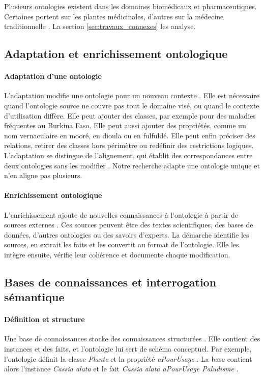 Plusieurs ontologies existent dans les domaines biomédicaux et pharmaceutiques. Certaines portent sur les plantes médicinales, d'autres sur la médecine traditionnelle \cite{shojaee-mend_development_2019}. La section \ref{sec:travaux_connexes} les analyse.

\subsection{Adaptation et enrichissement ontologique}
\label{subsec:adaptation_enrichissement}

\paragraph{Adaptation d'une ontologie}
L'adaptation modifie une ontologie pour un nouveau contexte \cite{klein2001ontologyversioning}. Elle est nécessaire quand l'ontologie source ne couvre pas tout le domaine visé, ou quand le contexte d'utilisation diffère. Elle peut ajouter des classes, par exemple pour des maladies fréquentes au Burkina Faso. Elle peut aussi ajouter des propriétés, comme un nom vernaculaire en mooré, en dioula ou en fulfuldé. Elle peut enfin préciser des relations, retirer des classes hors périmètre ou redéfinir des restrictions logiques. L'adaptation se distingue de l'alignement, qui établit des correspondances entre deux ontologies sans les modifier \cite{euzenat2013ontology}. Notre recherche adapte une ontologie unique et n'en aligne pas plusieurs.

\paragraph{Enrichissement ontologique}
L'enrichissement ajoute de nouvelles connaissances à l'ontologie à partir de sources externes \cite{navigli2003ontologylearning}. Ces sources peuvent être des textes scientifiques, des bases de données, d'autres ontologies ou des savoirs d'experts. La démarche identifie les sources, en extrait les faits et les convertit au format de l'ontologie. Elle les intègre ensuite, vérifie leur cohérence et documente chaque modification.

\subsection{Bases de connaissances et interrogation sémantique}
\label{subsec:bases_connaissances}

\paragraph{Définition et structure}
Une base de connaissances stocke des connaissances structurées \cite{guarino1995formalontology}. Elle contient des instances et des faits, et l'ontologie lui sert de schéma conceptuel. Par exemple, l'ontologie définit la classe \textit{\og Plante \fg} et la propriété \textit{\og aPourUsage \fg}. La base contient alors l'instance \textit{\og Cassia alata \fg} et le fait \textit{\og Cassia alata aPourUsage Paludisme \fg}.

